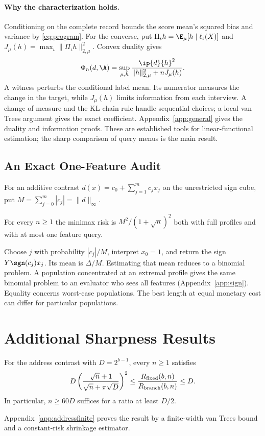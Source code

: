 \paragraph{Why the characterization holds.}
Conditioning on the complete record bounds the score mean's squared bias and variance by \eqref{eq:program}. For the converse, put $\Pi_\iota h=\E_\mu[h\mid\ell_\iota(X)]$ and $J_\mu(h)=\max_\iota\|\Pi_\iota h\|_{2,\mu}^2$. Convex duality gives
\begin{equation}
 \Phi_n(d,\A)=\sup_{\mu,h}
 \frac{\ip{d}{h}^2}{\|h\|_{2,\mu}^2+nJ_\mu(h)}.\label{eq:dual}
\end{equation}
A witness perturbs the conditional label mean. Its numerator measures the change in the target, while $J_\mu(h)$ limits information from each interview. A change of measure and the KL chain rule handle sequential choices; a local van Trees argument gives the exact coefficient. Appendix~\ref{app:general} gives the duality and information proofs. These are established tools for linear-functional estimation; the sharp comparison of query menus is the main result.

\subsection{An Exact One-Feature Audit}
For an additive contrast $d(x)=c_0+\sum_{j=1}^m c_j x_j$ on the unrestricted sign cube, put $M=\sum_{j=0}^m |c_j|=\|d\|_\infty$.
\begin{proposition}\label{prop:add}
For every $n\ge1$ the minimax risk is $M^2/(1+\sqrt n)^2$ both with full profiles and with at most one feature query.
\end{proposition}
Choose $j$ with probability $|c_j|/M$, interpret $x_0=1$, and return the sign $Y\sgn(c_j)x_j$. Its mean is $\Delta/M$. Estimating that mean reduces to a binomial problem. A population concentrated at an extremal profile gives the same binomial problem to an evaluator who sees all features (Appendix~\ref{app:sign}). Equality concerns worst-case populations. The best length at equal monetary cost can differ for particular populations.


\section{Additional Sharpness Results}
\begin{proposition}\label{prop:finiteaddress}
For the address contrast with $D=2^{b-1}$, every $n\ge1$ satisfies
\[
 D\left(\frac{\sqrt n+1}{\sqrt n+\pi\sqrt D}\right)^2
 \le\frac{R_{\rm fixed}(b,n)}{R_{\rm branch}(b,n)}\le D.
\]
In particular, $n\ge60D$ suffices for a ratio at least $D/2$.
\end{proposition}
Appendix~\ref{app:addressfinite} proves the result by a finite-width van Trees bound and a constant-risk shrinkage estimator.

